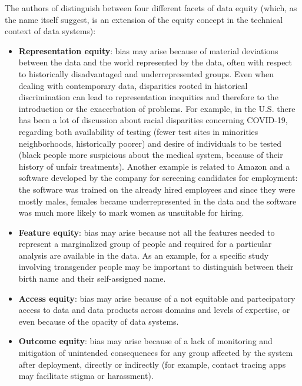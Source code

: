 The authors of \cite{jagadish2021the} distinguish between four different facets of data equity (which, as the name itself suggest, is an extension of the equity concept in the technical context of data systems):
\begin{itemize}
\item \textbf{Representation equity}: bias may arise because of material deviations between the data and the world represented by the data, often with respect to historically disadvantaged and underrepresented groups. Even when dealing with contemporary data, disparities rooted in historical discrimination can lead to representation inequities and therefore to the introduction or the exacerbation of problems. For example, in the U.S. there has been a lot of discussion about racial disparities concerning COVID-19, regarding both availability of testing (fewer test sites in minorities neighborhoods, historically poorer) and desire of individuals to be tested (black people more suspicious about the medical system, because of their history of unfair treatments). Another example is related to Amazon and a software developed by the company for screening candidates for employment: the software was trained on the already hired employees and since they were mostly males, females became underrepresented in the data and the software was much more likely to mark women as unsuitable for hiring.
\item \textbf{Feature equity}: bias may arise because not all the features needed to represent a marginalized group of people and required for a particular analysis are available in the data. As an example, for a specific study involving transgender people may be important to distinguish between their birth name and their self-assigned name.
\item \textbf{Access equity}: bias may arise because of a not equitable and partecipatory access to data and data products across domains and levels of expertise, or even because of the opacity of data systems.
\item \textbf{Outcome equity}: bias may arise because of a lack of monitoring and mitigation of unintended consequences for any group affected by the system after deployment, directly or indirectly (for example, contact tracing apps may facilitate stigma or harassment).
\end{itemize}


